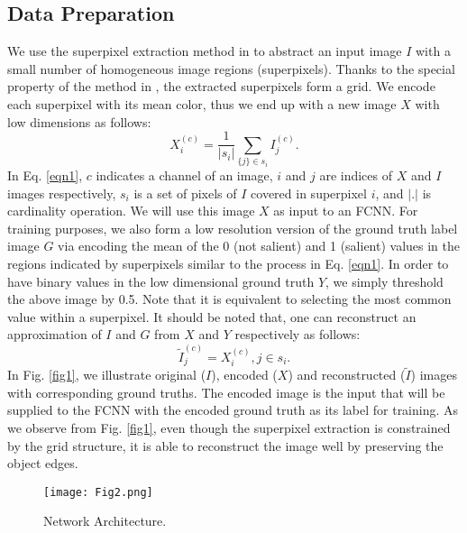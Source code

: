 \documentclass[a4paper,conference]{IEEEtran}
\begin{document}
\subsection{Data Preparation}
We use the superpixel extraction method in \cite{Fu} to abstract an input image $ I $ with a small number of homogeneous image regions (superpixels).
Thanks to the special property of the method in \cite{Fu}, the extracted superpixels form a grid.
We encode each superpixel with its mean color, thus we end up with a new image $ X $ with low dimensions as follows:
\begin{equation}
X^{(c)}_{i}=\frac{1}{|s_{i}|}\sum_{\{j\}\in s_{i}}I^{(c)}_{j}.
\label{eqn1}
\end{equation}
In Eq. \ref{eqn1}, $ c $ indicates a channel of an image, $ i $ and $ j $ are indices of $ X $ and $ I $ images respectively, $ s_{i} $ is a set of pixels of $ I $ covered in superpixel $ i $, and $ |.| $ is cardinality operation.
We will use this image $ X $ as input to an FCNN.
For training purposes, we also form a low resolution version of the ground truth label image $ G $ via encoding the mean of the 0 (not salient) and 1 (salient) values in the regions indicated by superpixels similar to the process in Eq. \ref{eqn1}.
In order to have binary values in the low dimensional ground truth $ Y $, we simply threshold the above image by 0.5. Note that it is equivalent to selecting the most common value within a superpixel.
It should be noted that, one can reconstruct an approximation of $ I $ and $ G $ from $ X $ and $ Y $ respectively as follows:
\begin{equation}
\tilde{I}^{(c)}_{j}=X^{(c)}_{i}, j\in s_{i}.
\label{eqn2}
\end{equation}
In Fig. \ref{fig1}, we illustrate original ($ I $), encoded ($ X $) and reconstructed ($ \tilde{I} $) images with corresponding ground truths.
The encoded image is the input that will be supplied to the FCNN with the encoded ground truth as its label for training.
As we observe from Fig. \ref{fig1}, even though the superpixel extraction is constrained by the grid structure, it is able to reconstruct the image well by preserving the object edges.


\begin{figure}[!t]
\centering
\texttt{[image: Fig2.png]}
\caption{Network Architecture.}
\label{fig2}
\end{figure}
\end{document}
